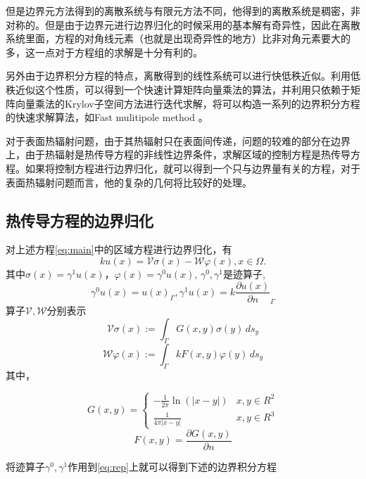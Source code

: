 但是边界元方法得到的离散系统与有限元方法不同，他得到的离散系统是稠密，非对称的。但是由于边界元进行边界归化的时候采用的基本解有奇异性，因此在离散系统里面，方程的对角线元素（也就是出现奇异性的地方）比非对角元素要大的多，这一点对于方程组的求解是十分有利的。

另外由于边界积分方程的特点，离散得到的线性系统可以进行快低秩近似\cite{fong2009,Messner2011,ho2012}。利用低秩近似这个性质，可以得到一个快速计算矩阵向量乘法的算法，并利用只依赖于矩阵向量乘法的Krylov子空间方法进行迭代求解，将可以构造一系列的边界积分方程的快速求解算法，如Fast mulitipole method \cite{Nishimura2002,liu2006,liu2008}。

对于表面热辐射问题，由于其热辐射只在表面间传递，问题的较难的部分在边界上，由于热辐射是热传导方程的非线性边界条件，求解区域的控制方程是热传导方程。如果将控制方程进行边界归化，就可以得到一个只与边界量有关的方程，对于表面热辐射问题而言，他的复杂的几何将比较好的处理。

\subsection{热传导方程的边界归化}

对上述方程\eqref{eq:main}中的区域方程进行边界归化，有
\begin{equation}
	k u(x) = \mathcal{V} \sigma(x) - \mathcal{W}\varphi(x) , x \in \Omega.
	\label{eq:rep}
\end{equation}
其中$\sigma(x) = \gamma^1 u(x) $，$\varphi(x) = \gamma^0 u(x)$, $\gamma^0, \gamma^1$是迹算子,
\[
		\gamma^0 u(x) = u(x)_\Gamma ,
		\gamma^1 u(x) = k\frac{ \partial u(x)} {\partial n}_\Gamma 
\]
算子$\mathcal{V,W}$分别表示
\begin{equation}
	\mathcal{V}\sigma(x) := \int_{\Gamma} G(x,y)\sigma(y)\,ds_y
\end{equation}
\begin{equation}
	\mathcal{W}\varphi(x) := \int_{\Gamma} k F(x,y)\varphi(y)\,ds_y
\end{equation}
其中，

\[G(x,y) = \left\{ {\begin{array}{*{20}{c}}
  { - \frac{1}{{2\pi }}\ln (|x - y|)}&{x,y \in {R^2}} \\ 
  {\frac{1}{{4\pi |x - y|}}}&{x,y \in {R^3}} 
\end{array}} \right.\]
\[
F(x,y) = \frac{{\partial G(x,y)}}{{\partial n}}
\]

将迹算子$\gamma^0, \gamma^1$作用到\eqref{eq:rep}上就可以得到下述的边界积分方程

